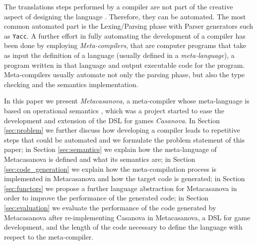 The translations steps performed by a compiler are not part of the creative aspect of designing the language \cite{book1970cwic, czarnecki2000generative}. Therefore, they can be automated. The most common automated part is the Lexing/Parsing phase with Parser generators such as \texttt{Yacc}. A further effort in fully automating the development of a compiler has been done by employing \textit{Meta-compilers}, that are computer programs that take as input the definition of a language (usually defined in a \textit{meta-language}), a program written in that language and output executable code for the program. Meta-compilers usually automate not only the parsing phase, but also the type checking and the semantics implementation.
 
In this paper we present \textit{Metacasanova}, a meta-compiler whose meta-language is based on operational semantics \cite{plotkin1981, kahn1987natural}, which was a project started to ease the development and extension of the DSL for games \textit{Casanova}. In Section \ref{sec:problem} we further discuss how developing a compiler leads to repetitive steps that could be automated and we formulate the problem statement of this paper; in Section \ref{sec:semantics} we explain how the meta-language of Metacasanova is defined and what its semantics are; in Section \ref{sec:code_generation} we explain how the meta-compilation process is implemented in Metacasanova and how the target code is generated; in Section \ref{sec:functors} we propose a further language abstraction for Metacasanova in order to improve the performance of the generated code; in Section \ref{sec:evaluation} we evaluate the performance of the code generated by Metacasanova after re-implementing Casanova \cite{abbadi2015casanova} in Metacasanova, a DSL for game development, and the length of the code necessary to define the language with respect to the meta-compiler.

